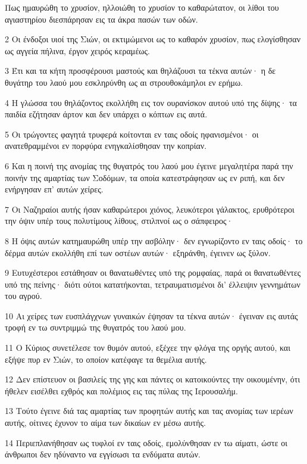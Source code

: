 \par Πως ημαυρώθη το χρυσίον, ηλλοιώθη το χρυσίον το καθαρώτατον, οι λίθοι του αγιαστηρίου διεσπάρησαν εις τα άκρα πασών των οδών.
\par 2 Οι ένδοξοι υιοί της Σιών, οι εκτιμώμενοι ως το καθαρόν χρυσίον, πως ελογίσθησαν ως αγγεία πήλινα, έργον χειρός κεραμέως.
\par 3 Έτι και τα κήτη προσφέρουσι μαστούς και θηλάζουσι τα τέκνα αυτών· η δε θυγάτηρ του λαού μου εσκληρύνθη ως αι στρουθοκάμηλοι εν ερήμω.
\par 4 Η γλώσσα του θηλάζοντος εκολλήθη εις τον ουρανίσκον αυτού υπό της δίψης· τα παιδία εζήτησαν άρτον και δεν υπάρχει ο κόπτων εις αυτά.
\par 5 Οι τρώγοντες φαγητά τρυφερά κοίτονται εν ταις οδοίς ηφανισμένοι· οι ανατεθραμμένοι εν πορφύρα ενηγκαλίσθησαν την κοπρίαν.
\par 6 Και η ποινή της ανομίας της θυγατρός του λαού μου έγεινε μεγαλητέρα παρά την ποινήν της αμαρτίας των Σοδόμων, τα οποία κατεστράφησαν ως εν ριπή, και δεν ενήργησαν επ' αυτών χείρες.
\par 7 Οι Ναζηραίοι αυτής ήσαν καθαρώτεροι χιόνος, λευκότεροι γάλακτος, ερυθρότεροι την όψιν υπέρ τους πολυτίμους λίθους, στιλπνοί ως ο σάπφειρος·
\par 8 Η όψις αυτών κατημαυρώθη υπέρ την ασβόλην· δεν εγνωρίζοντο εν ταις οδοίς· το δέρμα αυτών εκολλήθη επί των οστέων αυτών· εξηράνθη, έγεινεν ως ξύλον.
\par 9 Ευτυχέστεροι εστάθησαν οι θανατωθέντες υπό της ρομφαίας, παρά οι θανατωθέντες υπό της πείνης· διότι ούτοι κατατήκονται, τετραυματισμένοι δι' έλλειψιν γεννημάτων του αγρού.
\par 10 Αι χείρες των ευσπλάγχνων γυναικών έψησαν τα τέκνα αυτών· έγειναν εις αυτάς τροφή εν τω συντριμμώ της θυγατρός του λαού μου.
\par 11 Ο Κύριος συνετέλεσε τον θυμόν αυτού, εξέχεε την φλόγα της οργής αυτού, και εξήψε πυρ εν Σιών, το οποίον κατέφαγε τα θεμέλια αυτής.
\par 12 Δεν επίστευον οι βασιλείς της γης και πάντες οι κατοικούντες την οικουμένην, ότι ήθελεν εισέλθει εχθρός και πολέμιος εις τας πύλας της Ιερουσαλήμ.
\par 13 Τούτο έγεινε διά τας αμαρτίας των προφητών αυτής και τας ανομίας των ιερέων αυτής, οίτινες έχυνον το αίμα των δικαίων εν μέσω αυτής.
\par 14 Περιεπλανήθησαν ως τυφλοί εν ταις οδοίς, εμολύνθησαν εν τω αίματι, ώστε οι άνθρωποι δεν ηδύναντο να εγγίσωσι τα ενδύματα αυτών.
